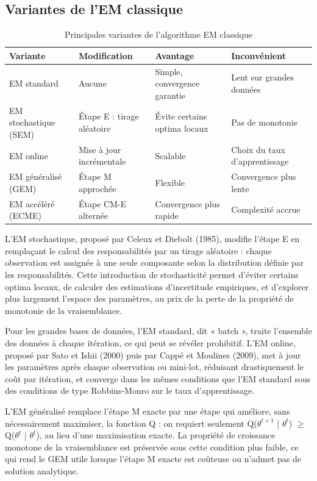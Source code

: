 \subsection{Variantes de l'EM classique}
\begin{table}[H]
\centering
\small
\setlength{\tabcolsep}{0.14cm}
\begin{tabular}{|p{3.54cm}|p{3.54cm}|p{3.54cm}|p{3.54cm}|}
\hline
\textbf{Variante} & \textbf{Modification} & \textbf{Avantage} & \textbf{Inconvénient} \\
\hline
EM standard & Aucune & Simple, convergence garantie & Lent sur grandes données \\
\hline
EM stochastique (SEM) & Étape E : tirage aléatoire & Évite certains optima locaux & Pas de monotonie \\
\hline
EM online & Mise à jour incrémentale & Scalable & Choix du taux d'apprentissage \\
\hline
EM généralisé (GEM) & Étape M approchée & Flexible & Convergence plus lente \\
\hline
EM accéléré (ECME) & Étape CM-E alternée & Convergence plus rapide & Complexité accrue \\
\hline
\end{tabular}
\caption{Principales variantes de l'algorithme EM classique}
\label{tab:1_3}
\end{table}
L'EM stochastique, proposé par Celeux et Diebolt (1985), modifie l'étape E en remplaçant le calcul des responsabilités par un tirage aléatoire : chaque observation est assignée à une seule composante selon la distribution définie par les responsabilités. Cette introduction de stochasticité permet d'éviter certains optima locaux, de calculer des estimations d'incertitude empiriques, et d'explorer plus largement l'espace des paramètres, au prix de la perte de la propriété de monotonie de la vraisemblance.

Pour les grandes bases de données, l'EM standard, dit « batch », traite l'ensemble des données à chaque itération, ce qui peut se révéler prohibitif. L'EM online, proposé par Sato et Ishii (2000) puis par Cappé et Moulines (2009), met à jour les paramètres après chaque observation ou mini-lot, réduisant drastiquement le coût par itération, et converge dans les mêmes conditions que l'EM standard sous des conditions de type Robbins-Monro sur le taux d'apprentissage.

L'EM généralisé remplace l'étape M exacte par une étape qui améliore, sans nécessairement maximiser, la fonction Q : on requiert seulement Q($\theta ^{t+1}$ | $\theta ^{t}$) $\geq $ Q($\theta ^{t}$ | $\theta ^{t}$), au lieu d'une maximisation exacte. La propriété de croissance monotone de la vraisemblance est préservée sous cette condition plus faible, ce qui rend le GEM utile lorsque l'étape M exacte est coûteuse ou n'admet pas de solution analytique.

